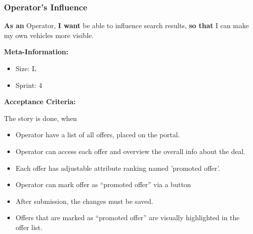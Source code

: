 \subsubsection{Operator's Influence}

\textbf{As an} Operator,\hfill\break
\textbf{I want} be able to influence search results,\hfill\break
\textbf{so that} I can make my own vehicles more visible.

\textbf{Meta-Information:}
\begin{itemize}
    \item Size: L
    \item Sprint: 4
\end{itemize}

\textbf{Acceptance Criteria:}

The story is done, when
\begin{itemize}
    \item Operator have a list of all offers, placed on the portal.
    \item Operator can access each offer and overview the overall info about the deal.
    \item Each offer has adjustable attribute ranking named 'promoted offer'.
    \item Operator can mark offer as “promoted offer” via a button
    \item After submission, the changes must be saved.
    \item Offers that are marked as “promoted offer” are visually highlighted in the offer list.
\end{itemize}
